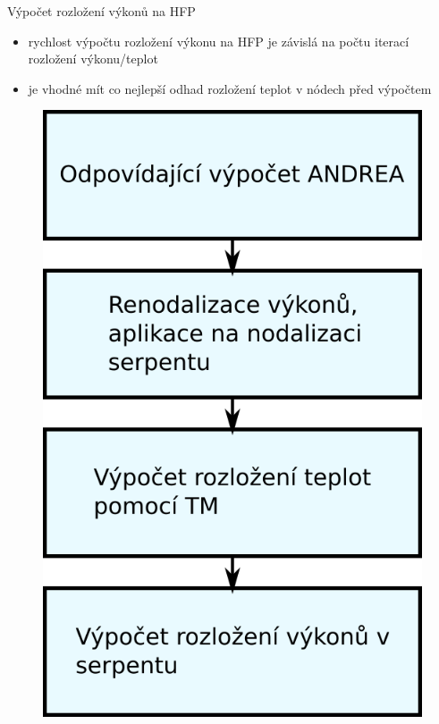 \documentclass{beamer}
\begin{document}
\begin{frame}{Výpočet rozložení výkonů na HFP}
\begin{block}{}
\begin{itemize}\scriptsize
	\item rychlost výpočtu rozložení výkonu na HFP je závislá na počtu iterací rozložení výkonu/teplot 
    \item je vhodné mít co nejlepší odhad rozložení teplot v nódech před výpočtem
\end{itemize}

\end{block}

\begin{figure}
	\centering
	\includegraphics[scale=0.4]{img/vypocet_teploty.png}
\end{figure}
\end{frame}
\end{document}
